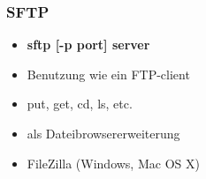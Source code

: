 \begin{frame}
\frametitle{SFTP}
\begin{itemize}
\item \textbf{sftp [-p port] server} 
\pause
\item Benutzung wie ein FTP-client
\pause
\item put, get, cd, ls, etc.
\pause
\item als Dateibrowsererweiterung
\pause
\item FileZilla (Windows, Mac OS X)
\end{itemize}
\end{frame}